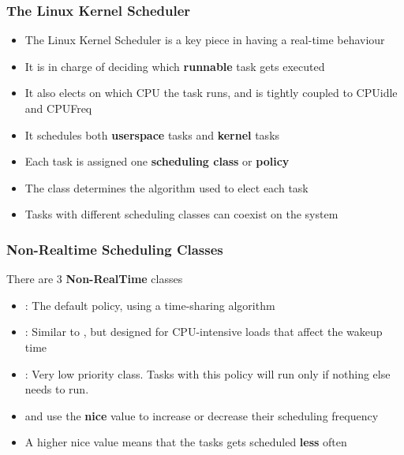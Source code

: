 \begin{frame}
	\frametitle{The Linux Kernel Scheduler}
	\begin{itemize}
		\item The Linux Kernel Scheduler is a key piece in having a real-time behaviour
		\item It is in charge of deciding which \textbf{runnable} task gets executed
		\item It also elects on which CPU the task runs, and is tightly coupled to CPUidle and CPUFreq
		\item It schedules both \textbf{userspace} tasks and \textbf{kernel} tasks
		\item Each task is assigned one \textbf{scheduling class} or \textbf{policy}
		\item The class determines the algorithm used to elect each task
		\item Tasks with different scheduling classes can coexist on the system
	\end{itemize}
\end{frame}

\begin{frame}
	\frametitle{Non-Realtime Scheduling Classes}
	There are 3 \textbf{Non-RealTime} classes
	\begin{itemize}
		\item {}: The default policy, using a time-sharing algorithm
		\item {}: Similar to , but designed for CPU-intensive loads that affect the wakeup time
		\item {}: Very low priority class. Tasks with this policy will run only if nothing else needs to run.
		\item {} and  use the \textbf{nice} value to increase or decrease their scheduling frequency
		\item A higher nice value means that the tasks gets scheduled \textbf{less} often
	\end{itemize}
\end{frame}

